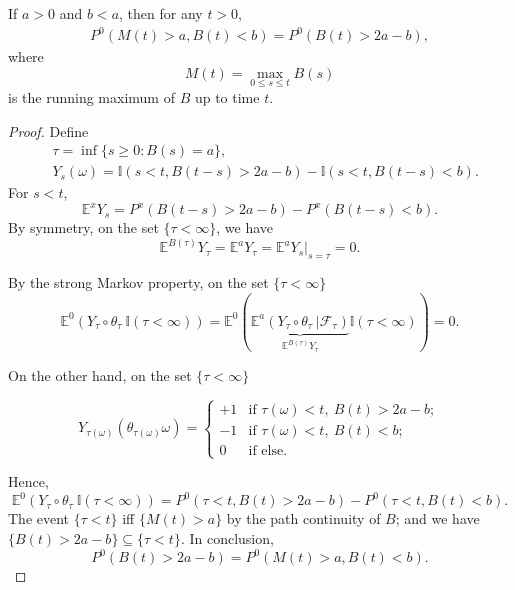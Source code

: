 \documentclass[10pt,a4paper]{amsart}
\begin{document}
\begin{theorem}
If $a>0$ and $b<a$, then for any $t>0$,
\begin{align}
    P^0\left(M(t)>a,B(t)<b\right) = P^0\left(B(t)>2a-b\right),
\end{align}
where 
\[
M(t) = \max_{0\le s\le t}B(s)
\]
is the running maximum of $B$ up to time $t$.
\end{theorem}

\begin{proof}
Define 
\begin{align*}
    &\tau = \inf\{s\ge 0 : B(s)=a\},\\
    &Y_s(\omega) = \mathbb{I}(s<t,B(t-s)>2a-b)-\mathbb{I}(s<t,B(t-s)<b).
\end{align*}
For $s<t$,
\[
\mathbb{E}^x Y_s = P^x(B(t-s)>2a-b)-P^x(B(t-s)<b).
\]
By symmetry, on the set $\{\tau<\infty\}$, we have
\[
\mathbb{E}^{B(\tau)} Y_\tau = \mathbb{E}^a Y_\tau = \mathbb{E}^a Y_s |_{s=\tau} = 0.
\]

By the strong Markov property, on the set $\{\tau<\infty\}$
\[
\mathbb{E}^0\left(Y_\tau\circ\theta_\tau\ \mathbb{I}(\tau<\infty)\right) = \mathbb{E}^0\left(\underbrace{\mathbb{E}^a\left(Y_\tau\circ\theta_\tau\ |\mathcal{F}_\tau\right)}_{\mathbb{E}^{B(\tau)}Y_\tau}\mathbb{I}(\tau<\infty)\right) = 0.
\]

On the other hand, on the set $\{\tau<\infty\}$

\[
 Y_{\tau(\omega)}(\theta_{\tau(\omega)}\omega) = \begin{cases}
    +1 & \text{if }\tau(\omega)<t,\ B(t)>2a-b;\\
    -1 & \text{if }\tau(\omega)<t,\ B(t)<b;\\
    0 & \text{if else}.
\end{cases}
\]

Hence,
\[
\mathbb{E}^0\left(Y_\tau\circ\theta_\tau\ \mathbb{I}(\tau<\infty)\right) = P^0(\tau<t,B(t)>2a-b)-P^0(\tau<t,B(t)<b).
\]
The event $\{\tau<t\}$ iff $\{M(t)>a\}$ by the path continuity of $B$; and we have $\{B(t)>2a-b\}\subseteq\{\tau<t\}$. In conclusion,
\[
P^0(B(t)>2a-b) = P^0(M(t)>a,B(t)<b).
\]
\end{proof}
\end{document}
